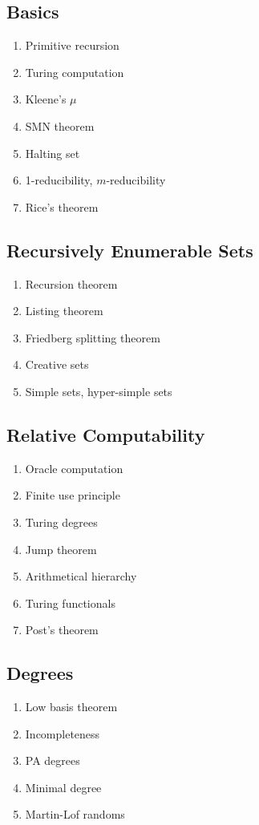 \documentclass{article}
\begin{document}
\subsection{Basics}
\begin{enumerate}
  \item Primitive recursion
  \item Turing computation
  \item Kleene's $\mu$
  \item SMN theorem
  \item Halting set
  \item 1-reducibility, $m$-reducibility
  \item Rice's theorem
\end{enumerate}

\subsection{Recursively Enumerable Sets} 
\begin{enumerate}
  \item Recursion theorem
  \item Listing theorem
  \item Friedberg splitting theorem
  \item Creative sets
  \item Simple sets, hyper-simple sets
\end{enumerate}

\subsection{Relative Computability} 
\begin{enumerate}
  \item Oracle computation
  \item Finite use principle
  \item Turing degrees
  \item Jump theorem
  \item Arithmetical hierarchy
  \item Turing functionals
  \item Post's theorem
\end{enumerate}

\subsection{Degrees} 
\begin{enumerate}
  \item Low basis theorem
  \item Incompleteness
  \item PA degrees
  \item Minimal degree
  \item Martin-Lof randoms
\end{enumerate}
\end{document}
